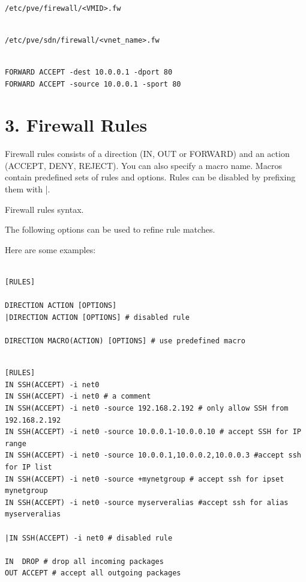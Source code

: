 \begin{lstlisting}

/etc/pve/firewall/<VMID>.fw

\end{lstlisting}

\begin{lstlisting}

/etc/pve/sdn/firewall/<vnet_name>.fw

\end{lstlisting}

\begin{lstlisting}

FORWARD ACCEPT -dest 10.0.0.1 -dport 80
FORWARD ACCEPT -source 10.0.0.1 -sport 80

\end{lstlisting}


\section{3. Firewall Rules}

Firewall rules consists of a direction (IN, OUT or FORWARD) and an action (ACCEPT, DENY, REJECT). You can also specify a macro name. Macros contain predefined sets of rules and options. Rules can be disabled by prefixing them with |.

Firewall rules syntax.

The following options can be used to refine rule matches.

Here are some examples:

\begin{lstlisting}

[RULES]

DIRECTION ACTION [OPTIONS]
|DIRECTION ACTION [OPTIONS] # disabled rule

DIRECTION MACRO(ACTION) [OPTIONS] # use predefined macro

\end{lstlisting}

\begin{lstlisting}

[RULES]
IN SSH(ACCEPT) -i net0
IN SSH(ACCEPT) -i net0 # a comment
IN SSH(ACCEPT) -i net0 -source 192.168.2.192 # only allow SSH from 192.168.2.192
IN SSH(ACCEPT) -i net0 -source 10.0.0.1-10.0.0.10 # accept SSH for IP range
IN SSH(ACCEPT) -i net0 -source 10.0.0.1,10.0.0.2,10.0.0.3 #accept ssh for IP list
IN SSH(ACCEPT) -i net0 -source +mynetgroup # accept ssh for ipset mynetgroup
IN SSH(ACCEPT) -i net0 -source myserveralias #accept ssh for alias myserveralias

|IN SSH(ACCEPT) -i net0 # disabled rule

IN  DROP # drop all incoming packages
OUT ACCEPT # accept all outgoing packages

\end{lstlisting}


